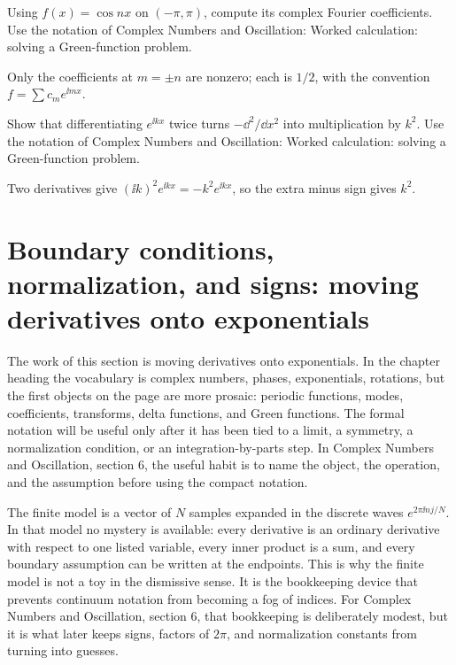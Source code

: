 \begin{exercise}
Using \(f(x)=\cos nx\) on \((-\pi,\pi)\), compute its complex Fourier coefficients.  Use the notation of Complex Numbers and Oscillation: Worked calculation: solving a Green-function problem.
\begin{answer}
Only the coefficients at \(m=\pm n\) are nonzero; each is \(1/2\), with the convention \(f=\sum c_me^{\ii mx}\).
\end{answer}
\end{exercise}

\begin{exercise}
Show that differentiating \(e^{\ii kx}\) twice turns \(-\dd^2/\dd x^2\) into multiplication by \(k^2\).  Use the notation of Complex Numbers and Oscillation: Worked calculation: solving a Green-function problem.
\begin{answer}
Two derivatives give \((\ii k)^2e^{\ii kx}=-k^2e^{\ii kx}\), so the extra minus sign gives \(k^2\).
\end{answer}
\end{exercise}



\section{Boundary conditions, normalization, and signs: moving derivatives onto exponentials}

The work of this section is moving derivatives onto exponentials.  In the chapter heading the vocabulary is complex numbers, phases, exponentials, rotations, but the first objects on the page are more prosaic: periodic functions, modes, coefficients, transforms, delta functions, and Green functions.  The formal notation will be useful only after it has been tied to a limit, a symmetry, a normalization condition, or an integration-by-parts step.  In Complex Numbers and Oscillation, section 6, the useful habit is to name the object, the operation, and the assumption before using the compact notation.

The finite model is a vector of \(N\) samples expanded in the discrete waves \(e^{2\pi \ii nj/N}\).  In that model no mystery is available: every derivative is an ordinary derivative with respect to one listed variable, every inner product is a sum, and every boundary assumption can be written at the endpoints.  This is why the finite model is not a toy in the dismissive sense.  It is the bookkeeping device that prevents continuum notation from becoming a fog of indices.  For Complex Numbers and Oscillation, section 6, that bookkeeping is deliberately modest, but it is what later keeps signs, factors of \(2\pi\), and normalization constants from turning into guesses.

